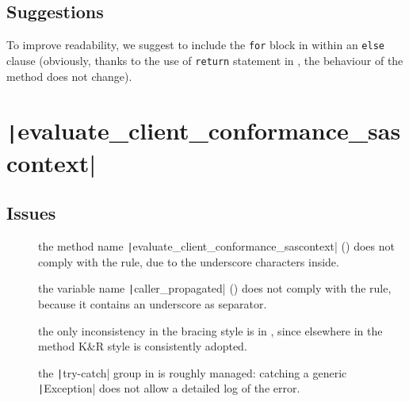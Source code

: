 \subsection{Suggestions}

To improve readability, we suggest to include the \texttt{for} block in  within an \texttt{else} clause (obviously, thanks to the use of  \texttt{return} statement in , the behaviour of the method does not change). 




\section{\normalfont\texttt|evaluate_client_conformance_sascontext|}


\subsection{Issues}

 

\begin{description}
	
	\item []
		the method name \texttt|evaluate_client_conformance_sascontext| () does not comply with the rule, due to the underscore characters inside.
	
	\item []
		the variable name \texttt|caller_propagated| () does not comply with the rule, because it contains an underscore as separator. 
	
	\item []
		the only inconsistency in the bracing style is in , since elsewhere in the method K\&R style is consistently adopted.
		
\end{description}




\begin{description}
	
	\item []
		the \texttt|try-catch| group in  is roughly managed: catching a generic \texttt|Exception| does not allow a detailed log of the error.

\end{description}


